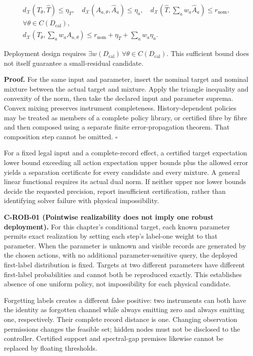 \documentclass[
  11pt,
  oneside]{book}
\begin{document}
\[
\begin{gathered}
d_{\mathcal X}(T_\theta,\widehat T)\le\eta_T,\quad
d_{\mathcal X}(A_{a,\theta},\widehat A_a)\le\eta_a,\quad
d_{\mathcal X}(\widehat T,\sum_a w_a\widehat A_a)\le r_{\mathrm{nom}},\\
\forall\theta\in C(D_{\mathrm{cal}}),\\
d_{\mathcal X}\!\left(T_\theta,\sum_a w_aA_{a,\theta}\right)
\le r_{\mathrm{nom}}+\eta_T+\sum_a w_a\eta_a.
\end{gathered}
\]

Deployment design requires
\(\exists w(D_{\mathrm{cal}})\,\forall\theta\in C(D_{\mathrm{cal}})\).
This sufficient bound does not itself guarantee a small-residual
candidate.

\textbf{Proof.} For the same input and parameter, insert the nominal
target and nominal mixture between the actual target and mixture. Apply
the triangle inequality and convexity of the norm, then take the
declared input and parameter suprema. Convex mixing preserves instrument
completeness. History-dependent policies may be treated as members of a
complete policy library, or certified fibre by fibre and then composed
using a separate finite error-propagation theorem. That composition step
cannot be omitted. \(\square\)

For a fixed legal input and a complete-record effect, a certified target
expectation lower bound exceeding all action expectation upper bounds
plus the allowed error yields a separation certificate for every
candidate and every mixture. A general linear functional requires its
actual dual norm. If neither upper nor lower bounds decide the requested
precision, report insufficient certification, rather than identifying
solver failure with physical impossibility.

\label{c-rob-01}{}

\textbf{C-ROB-01 (Pointwise realizability does not imply one robust
deployment).} For this chapter's conditional target, each known
parameter permits exact realization by setting each step's label-one
weight to that parameter. When the parameter is unknown and visible
records are generated by the chosen actions, with no additional
parameter-sensitive query, the deployed first-label distribution is
fixed. Targets at two different parameters have different first-label
probabilities and cannot both be reproduced exactly. This establishes
absence of one uniform policy, not impossibility for each physical
candidate.

Forgetting labels creates a different false positive: two instruments
can both have the identity as forgotten channel while always emitting
zero and always emitting one, respectively. Their complete record
distance is one. Changing observation permissions changes the feasible
set; hidden nodes must not be disclosed to the controller. Certified
support and spectral-gap premises likewise cannot be replaced by
floating thresholds.
\end{document}
